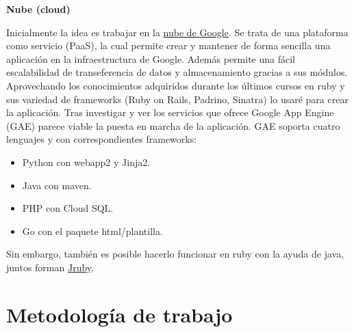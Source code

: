 \documentclass[a4paper,openright,14pt]{book}
\begin{document}
\vspace*{0.3in}
\begin{LARGE}
	\textbf{{\huge Nube (cloud)}}
\end{LARGE}

\vspace*{0.1in}
Inicialmente la idea es trabajar en la \href{https://cloud.google.com/appengine/docs}{nube de Google}. Se trata de una plataforma como servicio (PaaS), la cual permite crear y mantener de forma sencilla una aplicación en la infraestructura de Google. Además permite una fácil escalabilidad de transeferencia de datos y almacenamiento gracias a sus módulos.\\

Aprovechando los conocimientos adquiridos durante los últimos cursos en ruby y sus variedad de frameworks (Ruby on Rails, Padrino, Sinatra) lo usaré para crear la aplicación. Tras investigar y ver los servicios que ofrece Google App Engine (GAE) parece viable la puesta en marcha de la aplicación. GAE soporta cuatro lenguajes y con correspondientes frameworks:
\begin{itemize}
	\item Python con webapp2 y Jinja2.
	\item Java con maven.
	\item PHP con Cloud SQL.
	\item Go con el paquete html/plantilla. 
\end{itemize}
Sin embargo, también es posible hacerlo funcionar en ruby con la ayuda de java, juntos forman \href{http://jruby.org/}{Jruby}.

\vspace*{0.2in}
\section{Metodología de trabajo}\label{cap.1.3}
\end{document}
